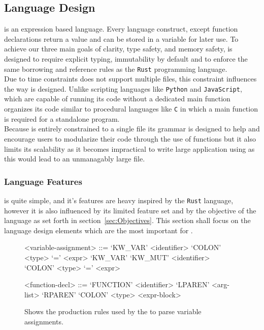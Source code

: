\subsection{Language Design}
\label{sec:LanguageDesign}

\lang{} is an expression based language. Every language construct, except function
declarations return a value and can be stored in a variable for later use. To achieve
our three main goals of clarity, type safety, and memory safety, \lang{} is designed
to require explicit typing, immutability by default and to enforce the same
borrowing and reference rules as the \texttt{Rust} programming language.\\

Due to time constraints \lang{} does not support multiple files, this constraint
influences the way \lang{} is designed. Unlike scripting languages like
\texttt{Python} and \texttt{JavaScript}, which are capable of running its code without
a dedicated main function \lang{} organizes its code similar to procedural
languages like \texttt{C} in which a main function is required for a standalone
program. \\

Because \lang{} is entirely constrained to a single file its grammar is designed to
help and encourage users to modularize their code through the use of functions but it
also limits its scalability as it becomes impractical to write large application
using \lang{} as this would lead to an unmanagably large file. 

\subsubsection{Language Features}
\label{sec:Grammar}

\lang{} is quite simple, and it's features are heavy inspired by the
\texttt{Rust} language\cite{RUST}, however it is also influenced by its limited feature set and
by the objective of the language as set forth in section~\ref{sec:Objectives}. This
section shall focus on the language design elements which are the most important for
\lang{}.

\begin{figure}[ht]
\centering
\begin{grammar}
<variable-assignment> ::= `KW_VAR' <identifier> `COLON' <type> `=' <expr>
\alt `KW_VAR' `KW_MUT' <identifier> `COLON' <type> `=' <expr>

<function-decl> ::= `FUNCTION' <identifier> `LPAREN' <arg-list> `RPAREN' `COLON' <type> <expr-block>
\end{grammar}
\caption{Shows the production rules used by the \parser{} to parse variable
assignments.}
\label{fig:assignmentRule}
\end{figure}

